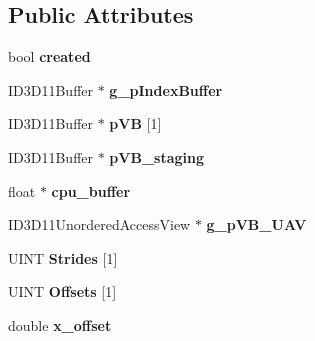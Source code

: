 \subsection*{Public Attributes}
\begin{DoxyCompactItemize}
\item 
\hypertarget{classpiece__of__cloth_ad8746148437992961c751d6067695f92}{bool {\bfseries created}}\label{classpiece__of__cloth_ad8746148437992961c751d6067695f92}

\item 
\hypertarget{classpiece__of__cloth_ae128180b12cc8c114c510ea1bd11e51f}{I\+D3\+D11\+Buffer $\ast$ {\bfseries g\+\_\+p\+Index\+Buffer}}\label{classpiece__of__cloth_ae128180b12cc8c114c510ea1bd11e51f}

\item 
\hypertarget{classpiece__of__cloth_afa4f9786516a769354d5a86b2862c9a6}{I\+D3\+D11\+Buffer $\ast$ {\bfseries p\+V\+B} \mbox{[}1\mbox{]}}\label{classpiece__of__cloth_afa4f9786516a769354d5a86b2862c9a6}

\item 
\hypertarget{classpiece__of__cloth_abc0fdf446e800d2ad319940e96ddcd11}{I\+D3\+D11\+Buffer $\ast$ {\bfseries p\+V\+B\+\_\+staging}}\label{classpiece__of__cloth_abc0fdf446e800d2ad319940e96ddcd11}

\item 
\hypertarget{classpiece__of__cloth_a44560c9fb69381112cabf6731d7108a3}{float $\ast$ {\bfseries cpu\+\_\+buffer}}\label{classpiece__of__cloth_a44560c9fb69381112cabf6731d7108a3}

\item 
\hypertarget{classpiece__of__cloth_a8bf3cf8297df6ff63236a5d5f0e46335}{I\+D3\+D11\+Unordered\+Access\+View $\ast$ {\bfseries g\+\_\+p\+V\+B\+\_\+\+U\+A\+V}}\label{classpiece__of__cloth_a8bf3cf8297df6ff63236a5d5f0e46335}

\item 
\hypertarget{classpiece__of__cloth_ad78bf16acc18e6378b426f62e3bdf189}{U\+I\+N\+T {\bfseries Strides} \mbox{[}1\mbox{]}}\label{classpiece__of__cloth_ad78bf16acc18e6378b426f62e3bdf189}

\item 
\hypertarget{classpiece__of__cloth_aba77ad3e1b859225ae5f7c9b785f2dc3}{U\+I\+N\+T {\bfseries Offsets} \mbox{[}1\mbox{]}}\label{classpiece__of__cloth_aba77ad3e1b859225ae5f7c9b785f2dc3}

\item 
\hypertarget{classpiece__of__cloth_adae0e9174256d9cda9471530305741e0}{double {\bfseries x\+\_\+offset}}\label{classpiece__of__cloth_adae0e9174256d9cda9471530305741e0}


\end{DoxyCompactItemize}
